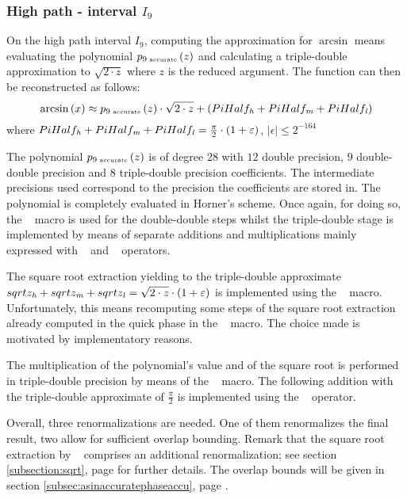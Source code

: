 \subsubsection{High path - interval $I_9$}
On the high path interval $I_9$, computing the approximation for
$\arcsin$ means evaluating the polynomial $p_{9 \mbox{\tiny~accurate}}\left( z \right)$ 
and calculating a triple-double approximation to $\sqrt{2 \cdot z}$ 
where $z$ is the reduced argument. The function can then be 
reconstructed as follows:
$$\arcsin\left( x \right) \approx p_{9 \mbox{\tiny~accurate}}\left( z \right) \cdot \sqrt{2\cdot z} + 
\left( PiHalf_{\mathit{h}} + PiHalf_{\mathit{m}} + PiHalf_{\mathit{l}} \right)$$ where
$PiHalf_{\mathit{h}} + PiHalf_{\mathit{m}} + PiHalf_{\mathit{l}} = \frac{\pi}{2} \cdot \left( 1 +
  \varepsilon \right)$, $\left \vert \epsilon \right \vert \leq 2^{-164}$

The polynomial $p_{9 \mbox{\tiny~accurate}}\left( z \right)$ is of
degree $28$ with $12$ double precision, $9$ double-double precision
and $8$ triple-double precision coefficients. The intermediate
precisions used correspond to the precision the coefficients are
stored in. The polynomial is completely evaluated in Horner's scheme.
Once again, for doing so, the \MulAddDdD~ macro is used for the
double-double steps whilst the triple-double stage is implemented by
means of separate additions and multiplications mainly expressed with
\AddTT~ and \MuldTT~ operators. 

The square root extraction yielding to the triple-double approximate
$sqrtz_{\mathit{h}} + sqrtz_{\mathit{m}} + sqrtz_{\mathit{l}} = \sqrt{2 \cdot z } \cdot
\left( 1 + \varepsilon \right)$ is implemented using the \SqrtT~ macro.
Unfortunately, this means recomputing some steps of the square root
extraction already computed in the quick phase in the \SqrtD~ macro.
The choice made is motivated by implementatory reasons.

The multiplication of the polynomial's value and of the square root is
performed in triple-double precision by means of the \MulTT~ macro.
The following addition with the triple-double approximate of
$\frac{\pi}{2}$ is implemented using the \AddTT~ operator. 

Overall, three renormalizations are needed. One of them renormalizes
the final result, two allow for sufficient overlap bounding. Remark
that the square root extraction by \SqrtT~ comprises an additional
renormalization; see section \ref{subsection:sqrt}, page
\pageref{subsection:sqrt} for further details.  The overlap bounds
will be given in section \ref{subsec:asinaccuratephaseaccu}, page
\pageref{subsec:asinaccuratephaseaccu}.

